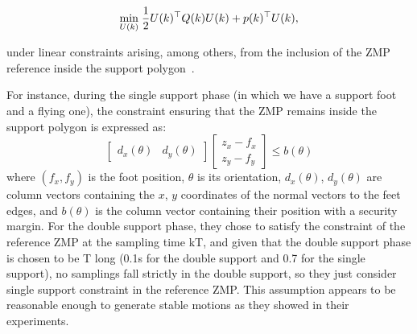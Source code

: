 \begin{equation}
 \underset{U(k)}{\min} \; \dfrac{1}{2} U(k)^{\top} Q(k) U(k) + p(k)^{\top} U(k),
\label{Eq:QP}
\end{equation}

under linear constraints arising, among others, from the inclusion of the ZMP reference inside the support polygon~\citep{HerdtAR2010}.

For instance, during the single support phase (in which we have a support foot and a flying one), the constraint ensuring that the ZMP remains inside the support polygon is expressed as:
\begin{equation}
  \begin{bmatrix} d_x(\theta) & d_y(\theta) \end{bmatrix}
  \begin{bmatrix} z_x - f_x \\ z_y - f_y \end{bmatrix} \leq b(\theta)
\end{equation}
where $(f_x,f_y)$ is the foot position, $\theta$ is its orientation,
$d_x(\theta)$, $d_y(\theta)$ are column vectors containing the $x$,
$y$ coordinates of the normal vectors to the feet edges, and $b(\theta)$  is the column vector containing their position with a security margin. For the double support phase, they chose to satisfy the constraint of the reference ZMP at the sampling time kT, and given that the double support phase is chosen to be T long (0.1s for the double support and 0.7 for the single support), no samplings fall strictly in the double support, so they just consider single support constraint in the reference ZMP. This assumption appears to be reasonable enough to generate stable motions as they showed in their experiments.